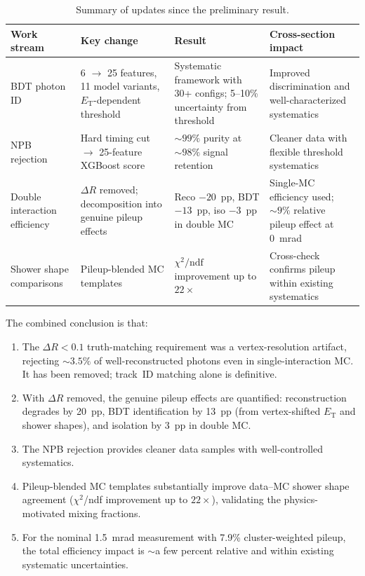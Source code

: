 \documentclass[11pt,a4paper]{article}
\newcommand{\ET}{\ensuremath{E_{\text{T}}}\xspace}
\newcommand{\chidf}{\ensuremath{\chi^2/\mathrm{ndf}}\xspace}
\newcommand{\DR}{\ensuremath{\Delta R}\xspace}
\begin{document}
\begin{table}[H]
    \centering
    \caption{Summary of updates since the preliminary result.}
    \label{tab:summary}
    \begin{tabular}{p{3cm}p{4cm}p{4cm}p{3cm}}
        \toprule
        Work stream & Key change & Result & Cross-section impact \\
        \midrule
        BDT photon ID &
          6 $\to$ 25 features, 11 model variants, \ET-dependent threshold &
          Systematic framework with 30+ configs; 5--10\% uncertainty from threshold &
          Improved discrimination and well-characterized systematics \\
        \midrule
        NPB rejection &
          Hard timing cut $\to$ 25-feature XGBoost score &
          ${\sim}99\%$ purity at ${\sim}98\%$ signal retention &
          Cleaner data with flexible threshold systematics \\
        \midrule
        Double interaction efficiency &
          \DR removed; decomposition into genuine pileup effects &
          Reco $-20$~pp, BDT $-13$~pp, iso $-3$~pp in double MC &
          Single-MC efficiency used; ${\sim}9\%$ relative pileup effect at 0~mrad \\
        \midrule
        Shower shape comparisons &
          Pileup-blended MC templates &
          \chidf improvement up to $22\times$ &
          Cross-check confirms pileup within existing systematics \\
        \bottomrule
    \end{tabular}
\end{table}

The combined conclusion is that:
\begin{enumerate}
    \item The $\DR < 0.1$ truth-matching requirement was a vertex-resolution
      artifact, rejecting ${\sim}3.5\%$ of well-reconstructed photons even in
      single-interaction MC. It has been removed; track~ID matching alone is
      definitive.
    \item With \DR removed, the genuine pileup effects are quantified:
      reconstruction degrades by 20~pp, BDT identification by 13~pp (from
      vertex-shifted \ET and shower shapes), and isolation by 3~pp in double MC.
    \item The NPB rejection provides cleaner data samples with well-controlled
      systematics.
    \item Pileup-blended MC templates substantially improve data--MC shower shape
      agreement ($\chi^2$/ndf improvement up to $22\times$), validating the
      physics-motivated mixing fractions.
    \item For the nominal 1.5~mrad measurement with 7.9\% cluster-weighted pileup,
      the total efficiency impact is ${\sim}$a few percent relative and within
      existing systematic uncertainties.
\end{enumerate}
\end{document}
